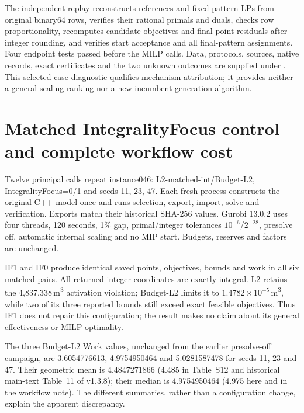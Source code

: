 \documentclass[11pt]{article}
\begin{document}
The independent replay reconstructs references and fixed-pattern LPs from original
binary64 rows, verifies their rational primals and duals, checks row proportionality,
recomputes candidate objectives and final-point residuals after integer rounding,
and verifies start acceptance and all final-pattern assignments. Four endpoint tests
passed before the MILP calls. Data, protocols, sources, native records, exact certificates
and the two unknown outcomes are supplied under
. This selected-case diagnostic
qualifies mechanism attribution; it provides neither a general scaling ranking nor
a new incumbent-generation algorithm.

\FloatBarrier
\endgroup
\section{Matched IntegralityFocus control and complete workflow cost}
\label{sec:si-if1-workflow}
Twelve principal calls repeat instance046: L2-matched-int/Budget-L2,
IntegralityFocus=0/1 and seeds 11, 23, 47. Each fresh process constructs the original
C++ model once and runs selection, export, import, solve and verification. Exports
match their historical SHA-256 values. Gurobi 13.0.2 uses four threads, 120 seconds,
1\% gap, primal/integer tolerances $10^{-6}$/$2^{-28}$, presolve off, automatic
internal scaling and no MIP start. Budgets, reserves and factors are unchanged.

IF1 and IF0 produce identical saved points, objectives, bounds and work in all six
matched pairs. All returned integer coordinates are exactly integral. L2 retains
the 4,837.338\,m\textsuperscript{3} activation violation; Budget-L2 limits it to
$1.4782\times10^{-5}$\,m\textsuperscript{3}, while two of its three reported bounds
still exceed exact feasible objectives. Thus IF1 does not repair this configuration;
the result makes no claim about its general effectiveness or MILP optimality.

The three Budget-L2 Work values, unchanged from the earlier presolve-off campaign,
are 3.6054776613, 4.9754950464 and 5.0281587478 for seeds 11, 23 and 47.
Their geometric mean is 4.4847271866 (4.485 in Table~S12 and historical main-text Table~11 of v1.3.8);
their median is 4.9754950464 (4.975 here and in the workflow note). The different
summaries, rather than a configuration change, explain the apparent discrepancy.
\end{document}

